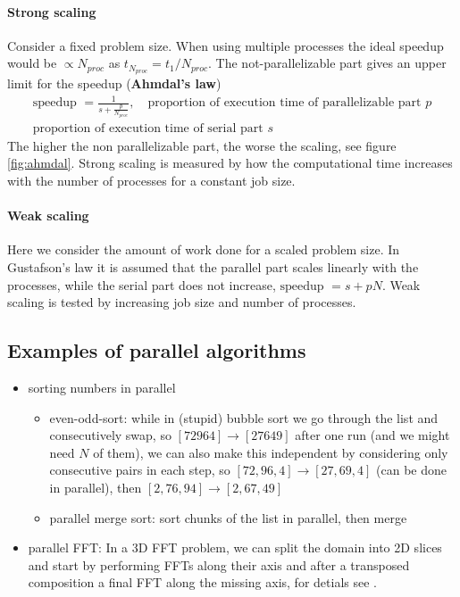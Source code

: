 \paragraph*{Strong scaling} Consider a fixed problem size. When using multiple processes
the ideal speedup would be $\propto N_{proc}$ as $t_{N_{proc}} = t_{1} \slash N_{proc}$. The not-parallelizable
part gives an upper limit for the speedup (\textbf{Ahmdal's law})
\begin{equation}
    \begin{gathered}
        \text{speedup } = \frac{1}{s + \frac{p}{N_{proc}}}, \quad \text{proportion of execution time of parallelizable part } p \\
        \text{proportion of execution time of serial part } s
    \end{gathered}
\end{equation}
The higher the non parallelizable part, the worse the scaling, see
figure \ref{fig:ahmdal}. Strong scaling is measured by how the
computational time increases with the number of processes for
a constant job size.

\paragraph*{Weak scaling} Here we consider the amount of work done
for a scaled problem size. In Gustafson's law it is assumed that the
parallel part scales linearly with the processes, while the serial
part does not increase, $\text{speedup } = s + pN$. Weak scaling
is tested by increasing job size and number of processes.


\subsection{Examples of parallel algorithms}
\begin{itemize}
    \item sorting numbers in parallel
    \begin{itemize}
        \item even-odd-sort: while in (stupid) bubble sort we go through the list and consecutively swap, so $[72964] \rightarrow [27649]$ after one
        run (and we might need $N$ of them), we can also make this independent by considering only consecutive pairs in each step, so
        $[72,96,4] \rightarrow [27,69,4]$ (can be done in parallel), then $[2,76,94] \rightarrow [2,67,49]$
        \item parallel merge sort: sort chunks of the list in parallel, then merge
    \end{itemize}
    \item parallel FFT: In a 3D FFT problem, we can split the domain into 2D slices and start by performing FFTs along their axis and after a transposed
    composition a final FFT along the missing axis, for detials see \cite{jagode06}.
\end{itemize}



